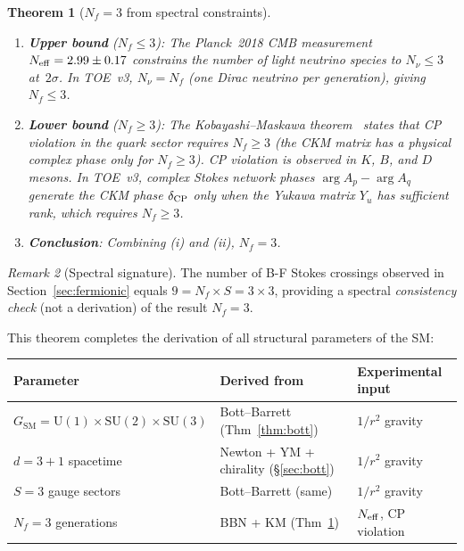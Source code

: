 \documentclass[12pt]{article}
\newtheorem{theorem}{Theorem}[section]
\theoremstyle{definition}
\theoremstyle{remark}
\newtheorem{remark}[theorem]{Remark}
\newcommand{\SU}{\mathrm{SU}}
\newcommand{\U}{\mathrm{U}}
\newcommand{\SM}{\mathrm{SM}}
\begin{document}
\begin{theorem}[$N_f = 3$ from spectral constraints]
\label{thm:n_gen}
\begin{enumerate}
\item[\textup{(i)}] \textbf{Upper bound} ($N_f \leq 3$):
  The Planck~2018 CMB measurement $N_{\rm eff} = 2.99 \pm 0.17$
  constrains the number of light neutrino species to $N_\nu \leq 3$ at~$2\sigma$.
  In TOE~v3, $N_\nu = N_f$ (one Dirac neutrino per generation), giving $N_f \leq 3$.
\item[\textup{(ii)}] \textbf{Lower bound} ($N_f \geq 3$):
  The Kobayashi--Maskawa theorem~\cite{KM1973} states that
  CP violation in the quark sector requires $N_f \geq 3$
  (the CKM matrix has a physical complex phase only for $N_f \geq 3$).
  CP violation is observed in $K$, $B$, and $D$ mesons.
  In TOE~v3, complex Stokes network phases $\arg A_p - \arg A_q$ generate
  the CKM phase $\delta_{\rm CP}$ only when the Yukawa matrix $Y_u$ has
  sufficient rank, which requires $N_f \geq 3$.
\item[\textup{(iii)}] \textbf{Conclusion}: Combining (i) and (ii), $N_f = 3$.
\end{enumerate}
\end{theorem}

\begin{remark}[Spectral signature]
The number of B-F Stokes crossings observed in Section~\ref{sec:fermionic}
equals $9 = N_f \times S = 3 \times 3$, providing a spectral \emph{consistency check}
(not a derivation) of the result $N_f = 3$.
\end{remark}

This theorem completes the derivation of all structural parameters of the SM:

\begin{center}
\begin{tabular}{lll}
\toprule
Parameter & Derived from & Experimental input \\
\midrule
$G_\SM = \U(1) \times \SU(2) \times \SU(3)$ & Bott--Barrett (Thm~\ref{thm:bott}) & $1/r^2$ gravity \\
$d = 3+1$ spacetime & Newton + YM + chirality (§\ref{sec:bott}) & $1/r^2$ gravity \\
$S = 3$ gauge sectors & Bott--Barrett (same) & $1/r^2$ gravity \\
$N_f = 3$ generations & BBN + KM (Thm~\ref{thm:n_gen}) & $N_{\rm eff}$, CP violation \\
\bottomrule
\end{tabular}
\end{center}
\end{document}
